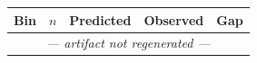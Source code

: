 \begin{tabular}{lrrrr}
\toprule
Bin & $n$ & Predicted & Observed & Gap \\
\midrule
\multicolumn{5}{c}{\textit{--- artifact not regenerated ---}} \\
\bottomrule
\end{tabular}
